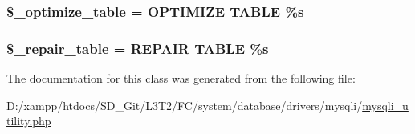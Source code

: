 \subsubsection[{\$\+\_\+optimize\+\_\+table}]{\setlength{\rightskip}{0pt plus 5cm}\$\+\_\+optimize\+\_\+table = \textquotesingle{}O\+P\+T\+I\+M\+I\+Z\+E T\+A\+B\+L\+E \%s\textquotesingle{}\hspace{0.3cm}{\ttfamily [protected]}}\label{class_c_i___d_b__mysqli__utility_a083199e5c22c78912dae0a47bb2d7fad}
\hypertarget{class_c_i___d_b__mysqli__utility_a5cf925cbd52e3f6ba5b7ada3fa436efc}{}
\subsubsection[{\$\+\_\+repair\+\_\+table}]{\setlength{\rightskip}{0pt plus 5cm}\$\+\_\+repair\+\_\+table = \textquotesingle{}R\+E\+P\+A\+I\+R T\+A\+B\+L\+E \%s\textquotesingle{}\hspace{0.3cm}{\ttfamily [protected]}}\label{class_c_i___d_b__mysqli__utility_a5cf925cbd52e3f6ba5b7ada3fa436efc}


The documentation for this class was generated from the following file\+:\begin{DoxyCompactItemize}
\item 
D\+:/xampp/htdocs/\+S\+D\+\_\+\+Git/\+L3\+T2/\+F\+C/system/database/drivers/mysqli/\hyperlink{mysqli__utility_8php}{mysqli\+\_\+utility.\+php}\end{DoxyCompactItemize}
